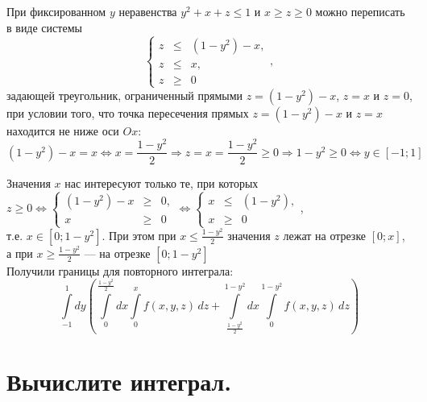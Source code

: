\documentclass[a4paper, fleqn]{article}
\begin{document}
    При фиксированном $y$ неравенства $y^2 + x + z \le 1$ и $x \ge z \ge 0$ можно переписать в виде системы
    \[ \left\{\begin{array}{rcl} z &\le& (1-y^2) - x, \\ z &\le& x, \\ z &\ge& 0 \end{array}\right., \]
    задающей треугольник, ограниченный прямыми $z = (1-y^2)-x$, $z = x$ и $z = 0$, при условии того, что точка пересечения прямых $z = (1-y^2)-x$ и $z = x$ находится не ниже оси $Ox$:
    \[ (1-y^2)-x = x \Leftrightarrow x = \frac{1-y^2}2 \Rightarrow z = x = \frac{1-y^2}2 \ge 0 \Rightarrow 1-y^2 \ge 0 \Leftrightarrow y \in [-1; 1] \]
    
    Значения $x$ нас интересуют только те, при которых $z \ge 0 \Leftrightarrow \left\{\begin{array}{rcl} (1-y^2)-x &\ge& 0, \\ x &\ge& 0 \end{array}\right. \Leftrightarrow \left\{\begin{array}{rcl} x &\le& (1-y^2), \\ x &\ge& 0 \end{array}\right.$, \\[3 pt]
    т.е. $x \in [0; 1-y^2]$. При этом при $x \le \frac{1-y^2}2$ значения $z$ лежат на отрезке $[0; x]$, а при $x \ge \frac{1-y^2}2$ --- на отрезке $[0; 1-y^2]$ \\
    
    Получили границы для повторного интеграла:
    \[ \int\limits_{-1}^{1} dy \left( \int\limits_{0}^{\frac{1-y^2}2} dx \int\limits_{0}^{x} f(x, y, z)\, dz + \int\limits_{\frac{1-y^2}2}^{1-y^2} dx \int\limits_{0}^{1-y^2} f(x, y, z)\, dz \right) \]
    
    \section*{Вычислите интеграл.}
\end{document}
